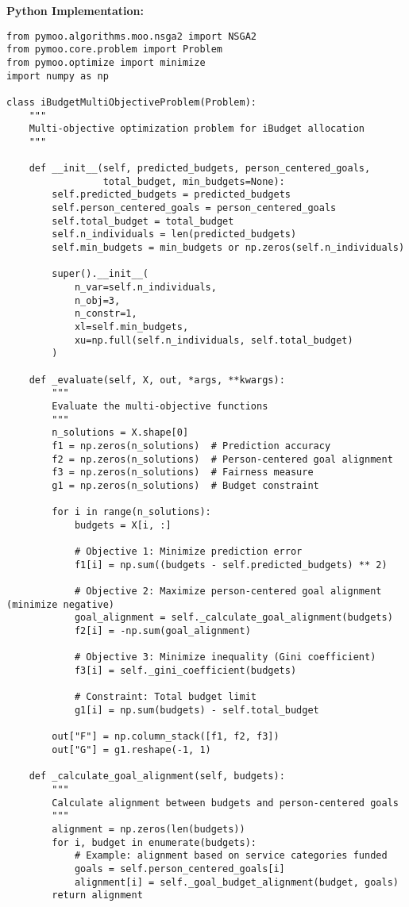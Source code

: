 \textbf{Python Implementation:}
\begin{lstlisting}
from pymoo.algorithms.moo.nsga2 import NSGA2
from pymoo.core.problem import Problem
from pymoo.optimize import minimize
import numpy as np

class iBudgetMultiObjectiveProblem(Problem):
    """
    Multi-objective optimization problem for iBudget allocation
    """
    
    def __init__(self, predicted_budgets, person_centered_goals, 
                 total_budget, min_budgets=None):
        self.predicted_budgets = predicted_budgets
        self.person_centered_goals = person_centered_goals
        self.total_budget = total_budget
        self.n_individuals = len(predicted_budgets)
        self.min_budgets = min_budgets or np.zeros(self.n_individuals)
        
        super().__init__(
            n_var=self.n_individuals,
            n_obj=3,
            n_constr=1,
            xl=self.min_budgets,
            xu=np.full(self.n_individuals, self.total_budget)
        )
    
    def _evaluate(self, X, out, *args, **kwargs):
        """
        Evaluate the multi-objective functions
        """
        n_solutions = X.shape[0]
        f1 = np.zeros(n_solutions)  # Prediction accuracy
        f2 = np.zeros(n_solutions)  # Person-centered goal alignment
        f3 = np.zeros(n_solutions)  # Fairness measure
        g1 = np.zeros(n_solutions)  # Budget constraint
        
        for i in range(n_solutions):
            budgets = X[i, :]
            
            # Objective 1: Minimize prediction error
            f1[i] = np.sum((budgets - self.predicted_budgets) ** 2)
            
            # Objective 2: Maximize person-centered goal alignment (minimize negative)
            goal_alignment = self._calculate_goal_alignment(budgets)
            f2[i] = -np.sum(goal_alignment)
            
            # Objective 3: Minimize inequality (Gini coefficient)
            f3[i] = self._gini_coefficient(budgets)
            
            # Constraint: Total budget limit
            g1[i] = np.sum(budgets) - self.total_budget
        
        out["F"] = np.column_stack([f1, f2, f3])
        out["G"] = g1.reshape(-1, 1)
    
    def _calculate_goal_alignment(self, budgets):
        """
        Calculate alignment between budgets and person-centered goals
        """
        alignment = np.zeros(len(budgets))
        for i, budget in enumerate(budgets):
            # Example: alignment based on service categories funded
            goals = self.person_centered_goals[i]
            alignment[i] = self._goal_budget_alignment(budget, goals)
        return alignment
    

\end{lstlisting}
